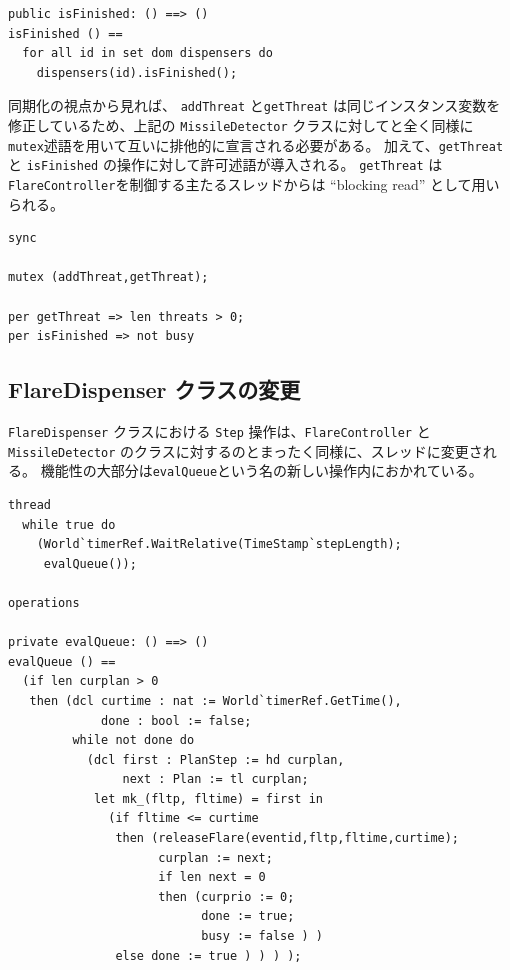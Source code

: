 \documentclass[\pformat,12pt]{jreport}
\begin{document}
\begin{lstlisting}
public isFinished: () ==> ()
isFinished () ==
  for all id in set dom dispensers do
    dispensers(id).isFinished();
\end{lstlisting}

同期化の視点から見れば、 \texttt{addThreat} と\texttt{getThreat} は同じインスタンス変数を修正しているため、上記の \texttt{MissileDetector} クラスに対してと全く同様に \texttt{mutex}述語を用いて互いに排他的に宣言される必要がある。
加えて、\texttt{getThreat} と \texttt{isFinished} の操作に対して許可述語が導入される。
\texttt{getThreat} は\texttt{FlareController}を制御する主たるスレッドからは ``blocking read'' として用いられる。

\begin{lstlisting}
sync

mutex (addThreat,getThreat);

per getThreat => len threats > 0;
per isFinished => not busy
\end{lstlisting}

\subsection{FlareDispenser クラスの変更}

 \texttt{FlareDispenser} クラスにおける \texttt{Step} 操作は、\texttt{FlareController} と \texttt{MissileDetector} のクラスに対するのとまったく同様に、スレッドに変更される。
機能性の大部分は\texttt{evalQueue}という名の新しい操作内におかれている。

\begin{lstlisting}
thread
  while true do
    (World`timerRef.WaitRelative(TimeStamp`stepLength);
     evalQueue());
     
operations

private evalQueue: () ==> ()
evalQueue () ==
  (if len curplan > 0
   then (dcl curtime : nat := World`timerRef.GetTime(),
             done : bool := false;
         while not done do
           (dcl first : PlanStep := hd curplan,
                next : Plan := tl curplan;
            let mk_(fltp, fltime) = first in
              (if fltime <= curtime
               then (releaseFlare(eventid,fltp,fltime,curtime);
                     curplan := next;
                     if len next = 0
                     then (curprio := 0; 
                           done := true; 
                           busy := false ) )
               else done := true ) ) ) );
\end{lstlisting}
\end{document}

